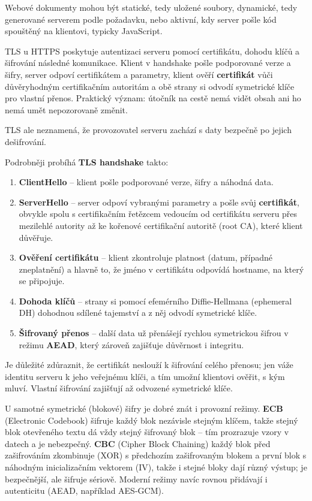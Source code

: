 \documentclass[11pt,a4paper]{article}
\begin{document}
Webové dokumenty mohou být statické, tedy uložené soubory, dynamické, tedy generované serverem podle požadavku, nebo aktivní, kdy server pošle kód spouštěný na klientovi, typicky JavaScript.

TLS u HTTPS poskytuje autentizaci serveru pomocí certifikátu, dohodu klíčů a šifrování následné komunikace. Klient v handshake pošle podporované verze a šifry, server odpoví certifikátem a parametry, klient ověří \textbf{certifikát} vůči důvěryhodným certifikačním autoritám a obě strany si odvodí symetrické klíče pro vlastní přenos. Praktický význam: útočník na cestě nemá vidět obsah ani ho nemá umět nepozorovaně změnit.

TLS ale neznamená, že provozovatel serveru zachází s daty bezpečně po jejich dešifrování.

Podrobněji probíhá \textbf{TLS handshake} takto:
\begin{enumerate}
  \item \textbf{ClientHello} -- klient pošle podporované verze, šifry a náhodná data.
  \item \textbf{ServerHello} -- server odpoví vybranými parametry a pošle svůj \textbf{certifikát}, obvykle spolu s certifikačním řetězcem vedoucím od certifikátu serveru přes mezilehlé autority až ke kořenové certifikační autoritě (root CA), které klient důvěřuje.
  \item \textbf{Ověření certifikátu} -- klient zkontroluje platnost (datum, případné zneplatnění) a hlavně to, že jméno v certifikátu odpovídá hostname, na který se připojuje.
  \item \textbf{Dohoda klíčů} -- strany si pomocí efemérního Diffie-Hellmana (ephemeral DH) dohodnou sdílené tajemství a z něj odvodí symetrické klíče.
  \item \textbf{Šifrovaný přenos} -- další data už přenášejí rychlou symetrickou šifrou v režimu \textbf{AEAD}, který zároveň zajišťuje důvěrnost i integritu.
\end{enumerate}

Je důležité zdůraznit, že certifikát neslouží k šifrování celého přenosu; jen váže identitu serveru k jeho veřejnému klíči, a tím umožní klientovi ověřit, s kým mluví. Vlastní šifrování zajišťují až odvozené symetrické klíče.

U samotné symetrické (blokové) šifry je dobré znát i provozní režimy. \textbf{ECB} (Electronic Codebook) šifruje každý blok nezávisle stejným klíčem, takže stejný blok otevřeného textu dá vždy stejný šifrovaný blok -- tím prozrazuje vzory v datech a je nebezpečný. \textbf{CBC} (Cipher Block Chaining) každý blok před zašifrováním zkombinuje (XOR) s předchozím zašifrovaným blokem a první blok s náhodným inicializačním vektorem (IV), takže i stejné bloky dají různý výstup; je bezpečnější, ale šifruje sériově. Moderní režimy navíc rovnou přidávají i autenticitu (AEAD, například AES-GCM).
\end{document}
